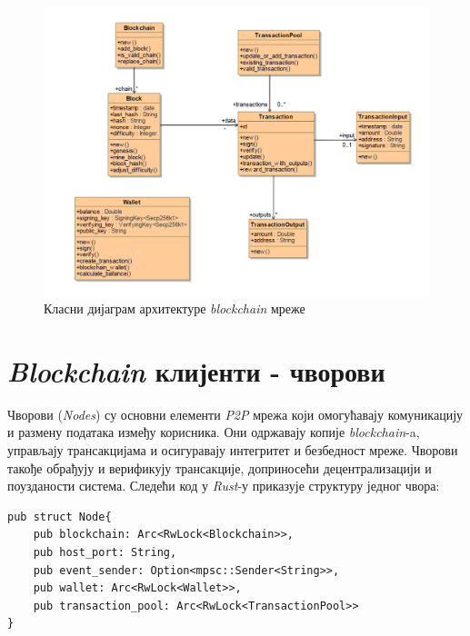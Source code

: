 \documentclass[12pt, a4paper]{article}
\begin{document}
\begin{figure}[h]
    \centering
    \includegraphics[width=1\linewidth]{slike/blockchain_class.png}
    \caption{Класни дијаграм архитектуре \textit{blockchain} мреже}
    \label{fig:enter-label}
\end{figure}

\newpage



\section{\textit{Blockchain} клијенти - чворови}
Чворови (\textit{Nodes}) су основни елементи \textit{P2P} мрежа који омогућавају комуникацију и размену података између корисника. Они одржавају копије \textit{blockchain}-a, управљају трансакцијама и осигуравају интегритет и безбедност мреже. Чворови такође обрађују и верификују трансакције, доприносећи децентрализацији и поузданости система. Следећи код у \textit{Rust}-у приказује структуру једног чвора:

\begin{verbatim}
pub struct Node{
    pub blockchain: Arc<RwLock<Blockchain>>,
    pub host_port: String,
    pub event_sender: Option<mpsc::Sender<String>>,
    pub wallet: Arc<RwLock<Wallet>>,
    pub transaction_pool: Arc<RwLock<TransactionPool>>
}

\end{verbatim}
\end{document}
